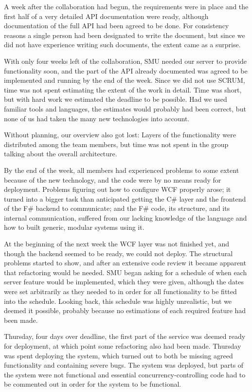 A week after the collaboration had begun, the requirements were in place and the first half of a very detailed API documentation were ready, although documentation of the full API had been agreed to be done. For consistency reasons a single person had been designated to write the document, but since we did not have experience writing such documents, the extent came as a surprise.

With only four weeks left of the collaboration, SMU needed our server to provide functionality soon, and the part of the API already documented was agreed to be implemented and running by the end of the week. Since we did not use SCRUM, time was not spent estimating the extent of the work in detail. Time was short, but with hard work we estimated the deadline to be possible.
Had we used familiar tools and languages, the estimates would probably had been correct, but none of us had taken the many new technologies into account.

Without planning, our overview also got lost: Layers of the functionality were distributed among the team members, but time was not spent in the group talking about the overall architecture.

By the end of the week, all members had experienced problems to some extent because of the new technology, and the code were by no means ready for deployment.
Problems figuring out how to configure WCF properly arose; it turned into a bigger task than anticipated getting the C\# layer and the frontend of the F\# backend to communicate; and the F\# code, its structure, and its internal communication, suffered from our lacking knowledge of the language and how to built generic, modular systems using it.

At the beginning of the next week the WCF layer was not finished yet, and though the backend seemed to be ready, we could not deploy. The structural problems started to show, and after an extensive code review it became apparent that refactoring would be needed.
SMU began asking for a schedule of when each server feature would be implemented, which they were given, although the dates were set arbitrarily as they needed to in order for all functionality to be fitted into the schedule. Looking back, this schedule was highly unrealistic, but we deemed it possible, probably because no estimations of each required feature had been made.

Thursday, four days over deadline, the first part of the service was deemed ready for deployment, at which point some refactoring also had been made. Thursday was spent deploying the system, which turned out to both be missing agreed functionality and containing severe bugs. The system was deployed, but parts of the system were not functional and essential concurrency-controlling code had to be commented out in order for the system to be functional.

